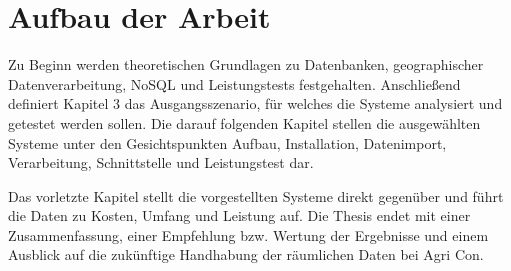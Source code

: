 \section{Aufbau der Arbeit}


Zu Beginn werden theoretischen Grundlagen zu Datenbanken, geographischer Datenverarbeitung, NoSQL und Leistungstests festgehalten.
Anschließend definiert Kapitel 3 das Ausgangsszenario, für welches die Systeme analysiert und getestet werden sollen.
Die darauf folgenden Kapitel stellen die ausgewählten Systeme unter den Gesichtspunkten Aufbau, Installation, Datenimport, Verarbeitung, Schnittstelle und Leistungstest dar.

Das vorletzte Kapitel stellt die vorgestellten Systeme direkt gegenüber und führt die Daten zu Kosten, Umfang und Leistung auf.
Die Thesis endet mit einer Zusammenfassung, einer Empfehlung bzw. Wertung der Ergebnisse und einem Ausblick auf die zukünftige Handhabung der räumlichen Daten bei Agri Con.